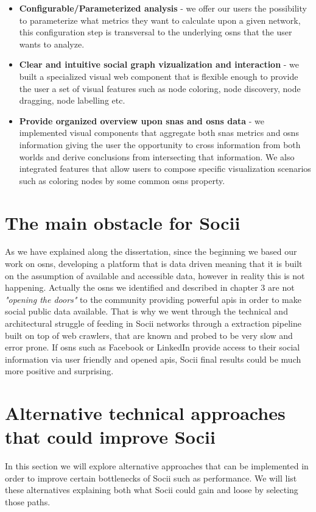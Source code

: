 \begin{itemize}
    \item \textbf{Configurable/Parameterized analysis} - we offer our users the possibility to parameterize what metrics they want to calculate upon a given network, this configuration step is transversal to the underlying \glspl{osn} that the user wants to analyze.
    \item \textbf{Clear and intuitive social graph vizualization and interaction} - we built a specialized visual web component that is flexible enough to provide the user a set of visual features such as node coloring, node discovery, node dragging, node labelling etc.
    \item \textbf{Provide organized overview upon \glspl{sna} and \glspl{osn} data} - we implemented visual components that aggregate both \glspl{sna} metrics and \glspl{osn} information giving the user the opportunity to cross information from both worlds and derive conclusions from intersecting that information. We also integrated features that allow users to compose specific visualization scenarios such as coloring nodes by some common \glspl{osn} property.
\end{itemize}

\section{The main obstacle for Socii}
As we have explained along the dissertation, since the beginning we based our work on \glspl{osn}, developing a platform that is data driven meaning that it is built on the assumption of available and accessible data, however in reality this is not happening. Actually the \glspl{osn} we identified and described in chapter 3 are not \textit{"opening the doors"} to the community providing powerful \glspl{api} in order to make social public data available. That is why we went through the technical and architectural struggle of feeding in Socii networks through a extraction pipeline built on top of web crawlers, that are known and probed to be very slow and error prone. If \glspl{osn} such as Facebook or LinkedIn provide access to their social information via user friendly and opened \glspl{api}, Socii final results could be much more positive and surprising.

\section{Alternative technical approaches that could improve Socii}
In this section we will explore alternative approaches that can be implemented in order to improve certain bottlenecks of Socii such as performance. We will list these alternatives explaining both what Socii could gain and loose by selecting those paths.

